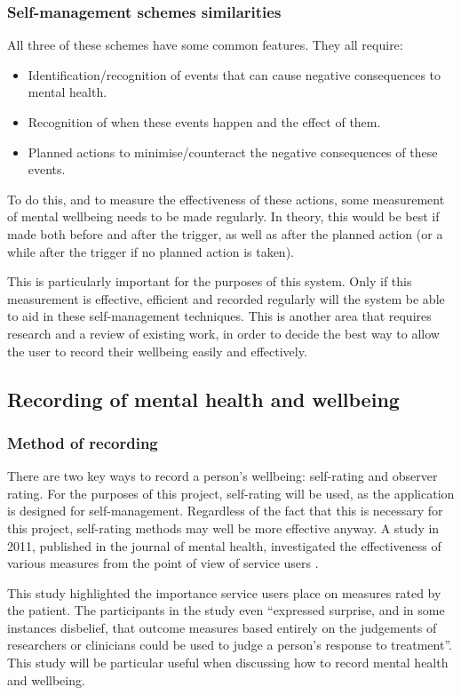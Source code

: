 \documentclass[11pt,openright,a4paper]{report}
\begin{document}
\subsubsection{Self-management schemes similarities}
All three of these schemes have some common features. They all require:
\begin{itemize}
\item Identification/recognition of events that can cause negative consequences to mental health.
\item Recognition of when these events happen and the effect of them.
\item Planned actions to minimise/counteract the negative consequences of these events.
\end{itemize}

To do this, and to measure the effectiveness of these actions, some measurement of mental wellbeing needs to be made regularly. In theory, this would be best if made both before and after the trigger, as well as after the planned action (or a while after the trigger if no planned action is taken).

This is particularly important for the purposes of this system. Only if this measurement is effective, efficient and recorded regularly will the system be able to aid in these self-management techniques. This is another area that requires research and a review of existing work, in order to decide the best way to allow the user to record their wellbeing easily and effectively.

\subsection{Recording of mental health and wellbeing} \label{recordingmentalhealth}
\subsubsection{Method of recording} \label{methodofrecording}
There are two key ways to record a person's wellbeing: self-rating and observer rating. For the purposes of this project, self-rating will be used, as the application is designed for self-management. Regardless of the fact that this is necessary for this project, self-rating methods may well be more effective anyway. A study in 2011, published in the journal of mental health, investigated the effectiveness of various measures from the point of view of service users \parencite{crawford2011selecting}.

This study highlighted the importance service users place on measures rated by the patient. The participants in the study even \enquote{expressed surprise, and in some instances disbelief, that outcome measures based entirely on the judgements of researchers or clinicians could be used to judge a person’s response to treatment}. This study will be particular useful when discussing how to record mental health and wellbeing.
\end{document}
